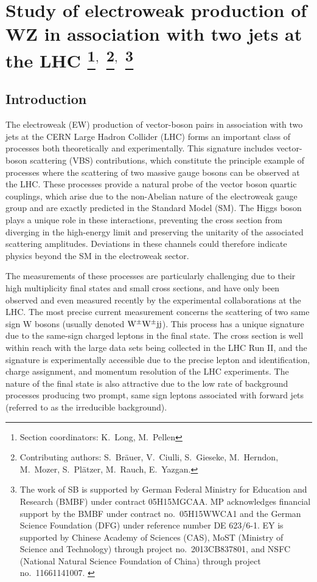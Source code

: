 \documentclass[11pt]{cernrep}
\begin{document}
\section{Study of electroweak production of WZ in association with two jets at the LHC 
\protect\footnote{Section coordinators: K.~Long, M.~Pellen}$^{,}$ 
\protect\footnote{Contributing authors: S.~Br\"auer, V.~Ciulli, S.~Gieseke, M.~Herndon, M.~Mozer, S.~Pl{\"a}tzer, M.~Rauch, E.~Yazgan.}$^{,}$
\protect\footnote{The work of SB is supported by German Federal Ministry for Education and Research (BMBF) under contract 05H15MGCAA.
MP acknowledges financial support by the BMBF under contract no.~05H15WWCA1 and the German Science Foundation (DFG) under reference number DE 623/6-1. 
EY is supported by Chinese Academy of Sciences (CAS), MoST (Ministry of Science and Technology) through project no.~2013CB837801, and NSFC (National Natural Science Foundation of China) through project no.~11661141007. 
\label{vbs_section}}}

\subsection{Introduction \label{vbs_intro}}

The electroweak (EW) production of vector-boson pairs in association with two jets at the CERN Large Hadron Collider (LHC) forms an important class of processes both theoretically and experimentally.
This signature includes vector-boson scattering (VBS) contributions, which constitute the principle example of processes where the scattering of two massive gauge bosons can be observed at the LHC.
These processes provide a natural probe of the vector boson quartic couplings, which arise due to the non-Abelian nature of the electroweak gauge group and are exactly predicted in the Standard Model (SM).
The Higgs boson plays a unique role in these interactions, preventing the cross section from diverging in the high-energy limit and preserving the unitarity of the associated scattering amplitudes.
Deviations in these channels could therefore indicate physics beyond the SM in the electroweak sector.

The measurements of these processes are particularly challenging due to their high multiplicity final states and small cross sections, and 
have only been observed and even measured recently by the experimental collaborations at the LHC.
The most precise current measurement \cite{Aad:2014zda,Khachatryan:2014sta,Sirunyan:2017ret,Aaboud:2016ffv} concerns the scattering of two same sign W bosons (usually denoted ${\rm W}^\pm{\rm W}^\pm{\rm j}{\rm j}$).
This process has a unique signature due to the same-sign charged leptons in the final state.
The cross section is well within reach with the large data sets being collected in the LHC Run II, and the
signature is experimentally accessible due to the precise lepton and identification, charge assignment, and momentum resolution of the LHC experiments.
The nature of the final state is also attractive due to the low rate of background processes
producing two prompt, same sign leptons associated with forward jets (referred to as the irreducible background).
\end{document}
